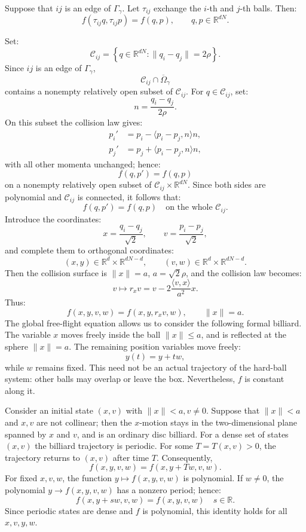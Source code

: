 \documentclass[12pt,reqno]{amsart}
\makeatletter
\renewenvironment{proof}[1][\proofname]{%
  \par\vspace{\topsep}%
  \normalfont\topsep6\p@\@plus6\p@\relax
  \trivlist
  \item[\hskip\labelsep\itshape #1\@addpunct{.}]\ignorespaces
}{%
  \endtrivlist
}
\numberwithin{equation}{section}
\def \R {\mathbb{R}}
\makeatother
\begin{document}
\begin{lemma}\label{lem:exchange}
Suppose that \(ij\) is an edge of \(\Gamma_\gamma\). Let
\(\tau_{ij}\) exchange the \(i\)-th and \(j\)-th balls. Then:
\[
f(\tau_{ij}q,\tau_{ij}p)=f(q,p),
\qquad q,p\in\R^{dN}.
\]
\end{lemma}
\begin{proof}
Set:
\[
\mathcal C_{ij}
=
\left\{
q\in\R^{dN}:\|q_i-q_j\|=2\rho
\right\}.
\]
Since \(ij\) is an edge of \(\Gamma_\gamma\),
\[
\mathcal C_{ij}\cap\overline{\Omega}_\gamma
\]
contains a nonempty relatively open subset of \(\mathcal C_{ij}\). For \(q\in\mathcal C_{ij}\), set:
\[
n=\frac{q_i-q_j}{2\rho}.
\]
On this subset the collision law gives:
\[
\begin{aligned}
p_i'&=p_i-\langle p_i-p_j,n\rangle n,\\
p_j'&=p_j+\langle p_i-p_j,n\rangle n,
\end{aligned}
\]
with all other momenta unchanged; hence:
\[
f(q,p')=f(q,p)
\]
on a nonempty relatively open subset of
\(\mathcal C_{ij}\times\R^{dN}\). Since both sides are polynomial and
\(\mathcal C_{ij}\) is connected, it 
follows that:
\[
f(q,p')=f(q,p)\quad \text{on the whole $\mathcal C_{ij}$.}
\]
Introduce the coordinates:
\[
x=\frac{q_i-q_j}{\sqrt2},
\qquad
v=\frac{p_i-p_j}{\sqrt2},
\]
and complete them to orthogonal 
coordinates:
\[
(x,y)\in\R^d\times\R^{dN-d},
\qquad
(v,w)\in\R^d\times\R^{dN-d}.
\]
Then the collision surface is \(\|x\|=a\), \(a = \sqrt{2} \rho\), and the collision law becomes:
\[
v\longmapsto
r_xv
=
v-2\frac{\langle v,x\rangle}{a^2}x.
\]
Thus:
\begin{equation}\label{eq:ball-reflection}
f(x,y,v,w)=f(x,y,r_xv,w),
\qquad \|x\|=a.
\end{equation}
The global free-flight equation 
allows us to consider the 
following formal billiard. The variable \(x\) moves freely inside the 
ball \(\|x\| \le a\), 
and is reflected at the sphere 
\(\|x\|=a\). The remaining position 
variables move freely:
\[
y(t)=y+tw,
\]
while \(w\) remains fixed. This need not be an actual trajectory of the
hard-ball system: other balls may overlap or leave the box. Nevertheless, \(f\) is constant along it. 
\smallskip%

Consider an initial state \((x,v)\) 
with \(\|x\|< a, v\neq 0\). Suppose that \(\|x\|<a\) and \(x,v\) are not 
collinear; then the \(x\)-motion stays in the two-dimensional plane spanned by \(x\) and
\(v\), and is an ordinary 
disc billiard. For a dense set of states \((x,v)\) the billiard trajectory 
is periodic. For some 
\(T = T(x,v) > 0\),
the trajectory returns to \((x,v)\) 
after time \(T\). Consequently,
\[
 f(x,y,v,w)
=
f(x,y+Tw,v,w).
\]
For fixed \(x,v,w\), the function \(y\mapsto f(x,y,v,w)\) is polynomial. If \(w\ne0\), the polynomial \(y\to f(x,y,v,w)\) has a nonzero
period; hence:
\begin{equation}\label{eq:period}
f(x,y+sw,v,w)=f(x,y,v,w) \quad s\in\R.
\end{equation}
Since periodic states are dense and \(f\) is polynomial, this identity
holds for all \(x,v,y,w\).
\smallskip%


\end{proof}
\end{document}
